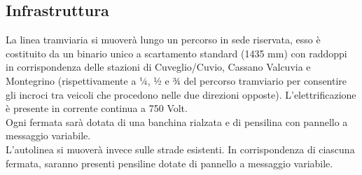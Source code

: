 \documentclass{article}
\begin{document}
\subsection{Infrastruttura}
La linea tramviaria si muoverà lungo un percorso in sede riservata, esso è costituito da un binario unico a scartamento standard (1435 mm) con raddoppi in corrispondenza delle stazioni di Cuveglio/Cuvio, Cassano Valcuvia e Montegrino (rispettivamente a ¼, ½ e ¾ del percorso tramviario per consentire gli incroci tra veicoli che procedono nelle due direzioni opposte). L'elettrificazione è presente in corrente continua a 750 Volt.\\
Ogni fermata sarà dotata di una banchina rialzata e di pensilina con pannello a messaggio variabile.\\
L’autolinea si muoverà invece sulle strade esistenti. In corrispondenza di ciascuna fermata, saranno presenti pensiline dotate di pannello a messaggio variabile.\\
\end{document}
